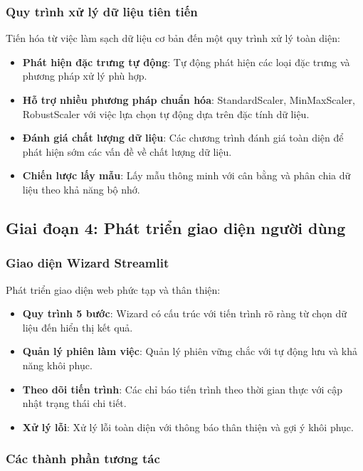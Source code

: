 \subsubsection{Quy trình xử lý dữ liệu tiên tiến}

Tiến hóa từ việc làm sạch dữ liệu cơ bản đến một quy trình xử lý toàn diện:

\begin{itemize}
    \item \textbf{Phát hiện đặc trưng tự động}: Tự động phát hiện các loại đặc trưng và phương pháp xử lý phù hợp.
    \item \textbf{Hỗ trợ nhiều phương pháp chuẩn hóa}: StandardScaler, MinMaxScaler, RobustScaler với việc lựa chọn tự động dựa trên đặc tính dữ liệu.
    \item \textbf{Đánh giá chất lượng dữ liệu}: Các chương trình đánh giá toàn diện để phát hiện sớm các vấn đề về chất lượng dữ liệu.
    \item \textbf{Chiến lược lấy mẫu}: Lấy mẫu thông minh với cân bằng và phân chia dữ liệu theo khả năng bộ nhớ.
\end{itemize}

\subsection{Giai đoạn 4: Phát triển giao diện người dùng}\label{subsec:ui-stage}

\subsubsection{Giao diện Wizard Streamlit}

Phát triển giao diện web phức tạp và thân thiện:

\begin{itemize}
    \item \textbf{Quy trình 5 bước}: Wizard có cấu trúc với tiến trình rõ ràng từ chọn dữ liệu đến hiển thị kết quả.
    \item \textbf{Quản lý phiên làm việc}: Quản lý phiên vững chắc với tự động lưu và khả năng khôi phục.
    \item \textbf{Theo dõi tiến trình}: Các chỉ báo tiến trình theo thời gian thực với cập nhật trạng thái chi tiết.
    \item \textbf{Xử lý lỗi}: Xử lý lỗi toàn diện với thông báo thân thiện và gợi ý khôi phục.
\end{itemize}

\subsubsection{Các thành phần tương tác}

